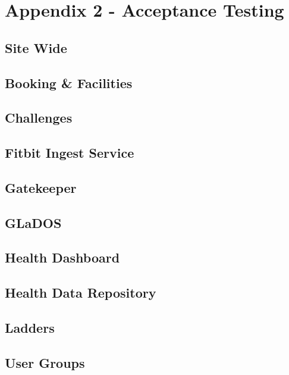 \section{Appendix 2 - Acceptance Testing}

\subsection{Site Wide}
	


\subsection{Booking \& Facilities}
	

\subsection{Challenges}
	

\subsection{Fitbit Ingest Service}
	

\subsection{Gatekeeper}
	

\subsection{GLaDOS}
	

\subsection{Health Dashboard}
	

\subsection{Health Data Repository}
	

\subsection{Ladders}
	

\subsection{User Groups}
	
